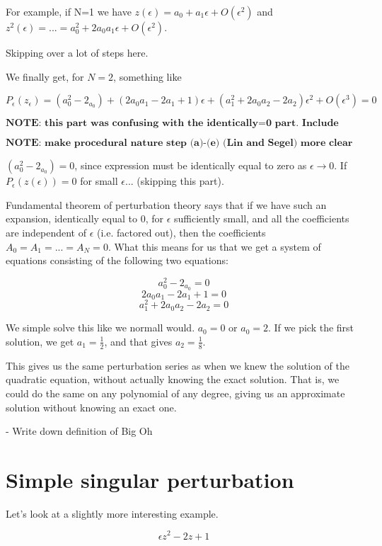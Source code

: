 \documentclass[12pt]{report}
\begin{document}
For example, if N=1 we have $z(\epsilon) = a_0 + a_1\epsilon + O(\epsilon^2)$
and $z^2(\epsilon) = ... = a_0^2 + 2 a_0 a_1 \epsilon + O(\epsilon^2)$.

Skipping over a lot of steps here.

We finally get, for $N=2$, something like

$$P_\epsilon(z_\epsilon) = (a_0^2 - 2_{a_0}) + (2 a_0 a_1 - 2 a_1 +1)\epsilon + (a_1^2 + 2 a_0 a_2 -
2 a_2)\epsilon^2 + O(\epsilon^3) = 0$$

$\textbf{NOTE: this part was confusing with the identically=0 part. Include proof of theorem?}$

$\textbf{NOTE: make procedural nature step (a)-(e) (Lin and Segel) more clear}$

$(a_0^2 - 2_{a_0}) = 0$, since expression must be identically equal to zero as
$\epsilon \to 0$. If $P_\epsilon(z(\epsilon)) = 0$ for small $\epsilon$... (skipping this part).

Fundamental theorem of perturbation theory says that if we have such an
expansion, identically equal to 0, for $\epsilon$ sufficiently small, and all
the coefficients are independent of $\epsilon$ (i.e. factored out), then the
coefficients $A_0 = A_1 = ... = A_N = 0$. What this means for us that we get a
system of equations consisting of the following two equations:

$$ a_0^2 - 2_{a_0} = 0$$
$$ 2 a_0 a_1 - 2 a_1 +1 = 0 $$
$$ a_1^2 + 2 a_0 a_2 -2 a_2 = 0$$

We simple solve this like we normall would. $a_0 = 0$ or $a_0 = 2$. If we pick
the first solution, we get $a_1=\frac 1 2$, and that gives $a_2 = \frac 1 8$.

This gives us the same perturbation series as when we knew the solution of the
quadratic equation, without actually knowing the exact solution. That is, we
could do the same on any polynomial of any degree, giving us an approximate
solution without knowing an exact one.


- Write down definition of Big Oh

\section{Simple singular perturbation}

Let's look at a slightly more interesting example.

\begin{equation}
  \epsilon z^2 - 2z + 1
\end{equation}
\end{document}

